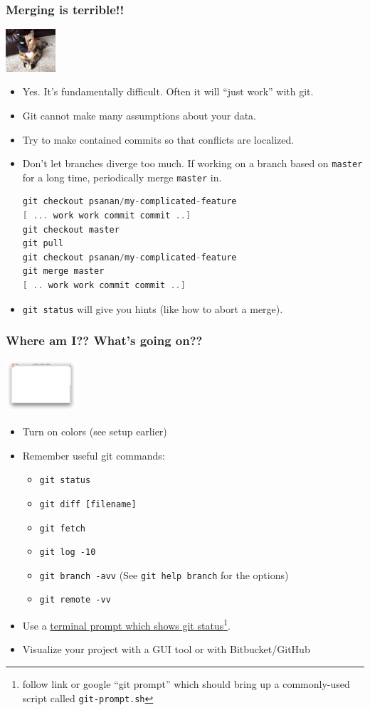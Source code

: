 \documentclass{beamer}
\begin{document}
\begin{frame}[fragile]
\frametitle{Merging is terrible!!}
\includegraphics[width=70px]{chimera.jpg}
\begin{itemize}
\item Yes. It's fundamentally difficult. Often it will ``just work'' with git.
\item Git cannot make many assumptions about your data.
\item Try to make contained commits so that conflicts are localized.
\item Don't let branches diverge too much. If working on a branch based on \texttt{master} for a long time, periodically merge \texttt{master} in.
\begin{lstlisting}[language=C++]
git checkout psanan/my-complicated-feature
[ ... work work commit commit ..]
git checkout master
git pull
git checkout psanan/my-complicated-feature
git merge master
[ .. work work commit commit ..]
\end{lstlisting}
\item \lstinline{git status} will give you hints (like how to abort a merge).
\end{itemize}
\end{frame}

\begin{frame}[fragile]
\frametitle{Where am I?? What's going on??}
\includegraphics[width=100px]{term}
\begin{itemize}
\item Turn on colors (see setup earlier)
\item 
Remember useful git commands:
\begin{itemize}
\item \lstinline{git status}
\item \lstinline{git diff [filename]}
\item \lstinline{git fetch}
\item \lstinline{git log -10}
\item \lstinline{git branch -avv} (See \lstinline{git help branch} for the options)
\item \lstinline{git remote -vv}
\end{itemize}
\item Use a \href{https://raw.githubusercontent.com/git/git/master/contrib/completion/git-prompt.sh}{terminal prompt which shows git status}\footnote{follow link or google ``git prompt'' which should bring up a commonly-used script called \texttt{git-prompt.sh}}.
\item Visualize your project with a GUI tool or with Bitbucket/GitHub
\end{itemize}
\end{frame}
\end{document}
